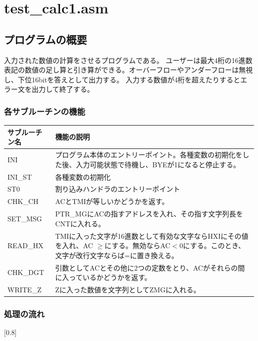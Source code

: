 \documentclass[dvipdfmx,12pt]{jreport}
\begin{document}
\section{test\_calc1.asm}
\subsection{プログラムの概要}
入力された数値の計算をさせるプログラムである。
ユーザーは最大4桁の16進数表記の数値の足し算と引き算ができる。オーバーフローやアンダーフローは無視し、下位16bitを答えとして出力する。
入力する数値が4桁を超えたりするとエラー文を出力して終了する。

\subsubsection{各サブルーチンの機能}

\begin{table}[h]
  \begin{tabular}{|l|p{10cm}|} \hline
    サブルーチン名 & 機能の説明 \\ \hline
    INI & プログラム本体のエントリーポイント。各種変数の初期化をした後、入力可能状態で待機し、BYEが1になると停止する。 \\ \hline
    INI\_ST & 各種変数の初期化 \\ \hline
    ST0 & 割り込みハンドラのエントリーポイント \\ \hline
    CHK\_CH & ACとTMIが等しいかどうかを返す。 \\ \hline
    SET\_MSG & PTR\_MGにACの指すアドレスを入れ、その指す文字列長をCNTに入れる。 \\ \hline
    READ\_HX & TMIに入った文字が16進数として有効な文字ならHXIにその値を入れ、AC $\geq$にする。無効ならAC$<$0にする。このとき、文字が改行文字ならば=に置き換える。 \\ \hline
    CHK\_DGT & 引数としてACとその他に2つの定数をとり、ACがそれらの間に入っているかどうかを返す。 \\ \hline
    WRITE\_Z & Zに入った数値を文字列としてZMGに入れる。\\ \hline
  \end{tabular}
\end{table}

\subsubsection{処理の流れ}
\scalebox{0.8}[0.8]{
  }
\end{document}
